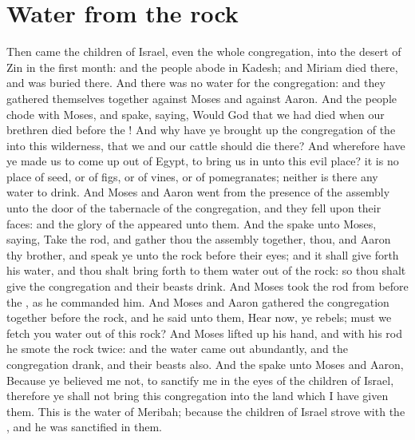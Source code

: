 \section*{Water from the rock}
\begin{biblechapter} %
\verse Then came the children of Israel, even the whole congregation, into the desert of Zin in the first month: and the people abode in Kadesh; and Miriam died there, and was buried there.
\verse And there was no water for the congregation: and they gathered themselves together against Moses and against Aaron.
\verse And the people chode with Moses, and spake, saying, Would God that we had died when our brethren died before the \LORD!
\verse And why have ye brought up the congregation of the \LORD into this wilderness, that we and our cattle should die there?
\verse And wherefore have ye made us to come up out of Egypt, to bring us in unto this evil place? it is no place of seed, or of figs, or of vines, or of pomegranates; neither is there any water to drink.
\verse And Moses and Aaron went from the presence of the assembly unto the door of the tabernacle of the congregation, and they fell upon their faces: and the glory of the \LORD appeared unto them.
\verse And the \LORD spake unto Moses, saying,
\verse Take the rod, and gather thou the assembly together, thou, and Aaron thy brother, and speak ye unto the rock before their eyes; and it shall give forth his water, and thou shalt bring forth to them water out of the rock: so thou shalt give the congregation and their beasts drink.
\verse And Moses took the rod from before the \LORD, as he commanded him.
\verse And Moses and Aaron gathered the congregation together before the rock, and he said unto them, Hear now, ye rebels; must we fetch you water out of this rock?
\verse And Moses lifted up his hand, and with his rod he smote the rock twice: and the water came out abundantly, and the congregation drank, and their beasts also.
\verse And the \LORD spake unto Moses and Aaron, Because ye believed me not, to sanctify me in the eyes of the children of Israel, therefore ye shall not bring this congregation into the land which I have given them.
\verse This is the water of Meribah; because the children of Israel strove with the \LORD, and he was sanctified in them.

\end{biblechapter}
